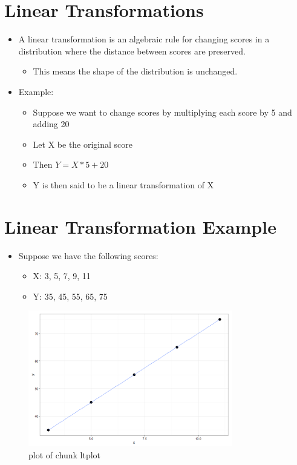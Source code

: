 \documentclass[12pt]{article}
\begin{document}
\section{Linear Transformations}\label{linear-transformations}

\begin{itemize}
\itemsep1pt\parskip0pt
\item
  A linear transformation is an algebraic rule for changing scores in a
  distribution where the distance between scores are preserved.

  \begin{itemize}
  \itemsep1pt\parskip0pt
  \item
    This means the shape of the distribution is unchanged.
  \end{itemize}
\item
  Example:

  \begin{itemize}
  \itemsep1pt\parskip0pt
  \item
    Suppose we want to change scores by multiplying each score by 5 and
    adding 20
  \item
    Let X be the original score
  \item
    Then \(Y = X*5 + 20\)
  \item
    Y is then said to be a linear transformation of X
  \end{itemize}
\end{itemize}

\section{Linear Transformation
Example}\label{linear-transformation-example}

\begin{itemize}
\itemsep1pt\parskip0pt
\item
  Suppose we have the following scores:

  \begin{itemize}
  \itemsep1pt\parskip0pt
  \item
    X: 3, 5, 7, 9, 11
  \item
    Y: 35, 45, 55, 65, 75
  \end{itemize}
\end{itemize}

\begin{figure}[H]
\centering
\includegraphics[width=3.5in]{figure/ltplot-1.png}
\caption{plot of chunk ltplot}
\end{figure}
\end{document}
